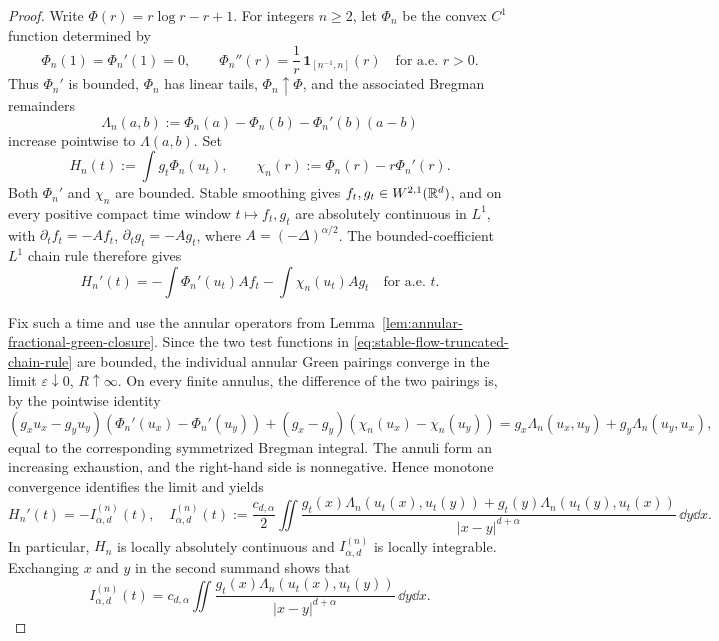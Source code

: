 \begin{proof}
Write \(\Phi(r)=r\log r-r+1\).  For integers \(n\ge2\), let \(\Phi_n\) be
the convex \(C^1\) function determined by
\[
 \Phi_n(1)=\Phi_n'(1)=0,
 \qquad
 \Phi_n''(r)=\frac1r\,\mathbf1_{[n^{-1},n]}(r)
 \quad\text{for a.e. }r>0.
\]
Thus \(\Phi_n'\) is bounded, \(\Phi_n\) has linear tails,
\(\Phi_n\uparrow\Phi\), and the associated Bregman remainders
\[
 \Lambda_n(a,b):=\Phi_n(a)-\Phi_n(b)-\Phi_n'(b)(a-b)
\]
increase pointwise to \(\Lambda(a,b)\).  Set
\[
 H_n(t):=\int g_t\Phi_n(u_t),
 \qquad
 \chi_n(r):=\Phi_n(r)-r\Phi_n'(r).
\]
Both \(\Phi_n'\) and \(\chi_n\) are bounded.  Stable smoothing gives
\(f_t,g_t\in W^{2,1}(\mathbb{R}^d)\), and on every positive compact time window
\(t\mapsto f_t,g_t\) are absolutely continuous in \(L^1\), with
\(\partial_t f_t=-Af_t\), \(\partial_tg_t=-Ag_t\),
where \(A=(-\Delta)^{\alpha/2}\).  The bounded-coefficient \(L^1\) chain rule
therefore gives
\begin{equation}\label{eq:stable-flow-truncated-chain-rule}
 H_n'(t)
 =-\int \Phi_n'(u_t)Af_t-\int \chi_n(u_t)Ag_t
 \quad\text{for a.e. }t.
\end{equation}

Fix such a time and use the annular operators from
Lemma~\ref{lem:annular-fractional-green-closure}.  Since the two test
functions in \eqref{eq:stable-flow-truncated-chain-rule} are bounded, the
individual annular Green pairings converge in the limit
\(\varepsilon\downarrow0\), \(R\uparrow\infty\).  On every finite annulus,
the difference of the two pairings is, by the pointwise identity
\[
 (g_xu_x-g_yu_y)(\Phi_n'(u_x)-\Phi_n'(u_y))
 +(g_x-g_y)(\chi_n(u_x)-\chi_n(u_y))
 =g_x\Lambda_n(u_x,u_y)+g_y\Lambda_n(u_y,u_x),
\]
equal to the corresponding symmetrized Bregman integral.  The annuli form
an increasing exhaustion, and the right-hand side is nonnegative.  Hence
monotone convergence identifies the limit and yields
\begin{equation}\label{eq:stable-flow-truncated-identity}
 H_n'(t)=-I_{\alpha,d}^{(n)}(t),
\quad
 I_{\alpha,d}^{(n)}(t):=\frac{c_{d,\alpha}}2
 \iint\frac{g_t(x)\Lambda_n(u_t(x),u_t(y))
 +g_t(y)\Lambda_n(u_t(y),u_t(x))}{|x-y|^{d+\alpha}}\,\dd y\dd x .
\end{equation}
In particular, \(H_n\) is locally absolutely continuous and
\(I_{\alpha,d}^{(n)}\) is locally integrable.
Exchanging \(x\) and \(y\) in the second summand shows that
\[
 I_{\alpha,d}^{(n)}(t)=c_{d,\alpha}
 \iint\frac{g_t(x)\Lambda_n(u_t(x),u_t(y))}
 {|x-y|^{d+\alpha}}\,\dd y\dd x .
\]


\end{proof}
